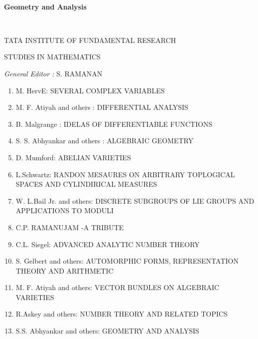 ~\vfill

\begin{center}
{\Large\bf Geometry and Analysis}
\medskip

\thispagestyle{empty}
\end{center}

\vfill\eject

~\phantom{a}
\thispagestyle{empty}

\begin{center}
TATA INSTITUTE OF FUNDAMENTAL RESEARCH

STUDIES IN MATHEMATICS

\bigskip
{\em General Editor :} S. \textsc{RAMANAN}
\end{center}

\begin{enumerate}
\item M. HervE: \textsc{SEVERAL COMPLEX VARIABLES} 

\item M. F. Atiyah and others : \textsc{DIFFERENTIAL ANALYSIS}

\item B. Malgrange : \textsc{IDELAS OF DIFFERENTIABLE FUNCTIONS}

\item S. S. Abhyankar and others : \textsc{ALGEBRAIC GEOMETRY}

\item D. Mumford:   \textsc{ABELIAN VARIETIES}

\item L.Schwartz: \textsc{RANDON MESAURES ON ARBITRARY TOPLOGICAL SPACES AND CYLINDIRICAL MEASURES}

\item W. L.Bail Jr. and others: \textsc{DISCRETE SUBGROUPS OF LIE GROUPS AND APPLICATIONS TO MODULI}

\item C.P. RAMANUJAM -A TRIBUTE

\item C.L. Siegel:  \textsc{ADVANCED ANALYTIC NUMBER THEORY}

\item S. Gelbert and others: \textsc{AUTOMORPHIC FORMS, REPRESENTATION THEORY AND ARITHMETIC}

\item M. F. Atiyah and others: \textsc{VECTOR BUNDLES ON ALGEBRAIC VARIETIES}

\item R.Askey and others: \textsc{NUMBER THEORY AND RELATED TOPICS}

\item S.S. Abhyankar and others: \textsc{GEOMETRY AND ANALYSIS}
\end{enumerate}

